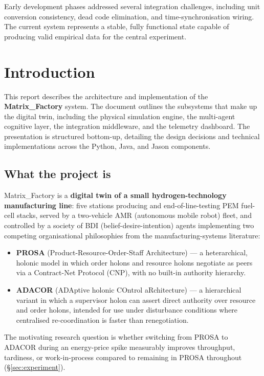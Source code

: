 \documentclass[twocolumn,10pt,a4paper]{article}
\begin{document}
Early development phases addressed several integration challenges, including unit conversion consistency, dead code elimination, and time-synchronisation wiring. The current system represents a stable, fully functional state capable of producing valid empirical data for the central experiment.

\section{Introduction}

This report describes the architecture and implementation of the \textbf{Matrix\_Factory} system. The document outlines the subsystems that make up the digital twin, including the physical simulation engine, the multi-agent cognitive layer, the integration middleware, and the telemetry dashboard. The presentation is structured bottom-up, detailing the design decisions and technical implementations across the Python, Java, and Jason components.

\subsection{What the project is}
Matrix\_Factory is a \textbf{digital twin of a small hydrogen-technology manufacturing line}: five stations producing and end-of-line-testing PEM fuel-cell stacks, served by a two-vehicle AMR (autonomous mobile robot) fleet, and controlled by a society of BDI (belief-desire-intention) agents implementing two competing organisational philosophies from the manufacturing-systems literature:

\begin{itemize}
\item \textbf{PROSA} (Product-Resource-Order-Staff Architecture) --- a heterarchical, holonic model in which order holons and resource holons negotiate as peers via a Contract-Net Protocol (CNP), with no built-in authority hierarchy.
\item \textbf{ADACOR} (ADAptive holonic COntrol aRchitecture) --- a hierarchical variant in which a supervisor holon can assert direct authority over resource and order holons, intended for use under disturbance conditions where centralised re-coordination is faster than renegotiation.
\end{itemize}

The motivating research question is whether switching from PROSA to ADACOR during an energy-price spike measurably improves throughput, tardiness, or work-in-process compared to remaining in PROSA throughout (\S\ref{sec:experiment}).
\end{document}

